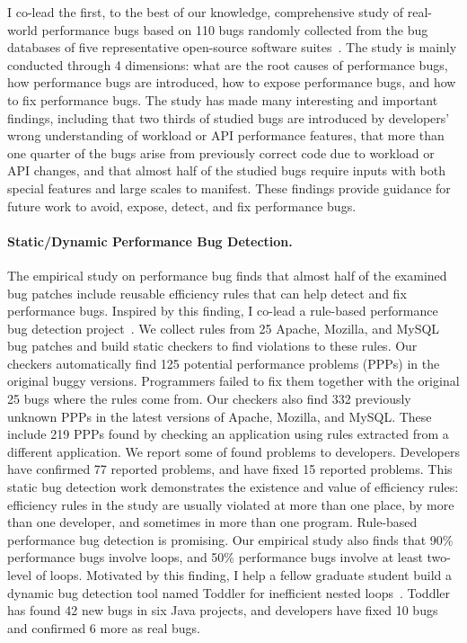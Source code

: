 \documentclass[10pt]{article}
\begin{document}
I co-lead the first, to the best of our knowledge, 
comprehensive study of real-world performance bugs based on 110 bugs randomly collected from the bug databases of five representative open-source software suites~\cite{jin12perfbug}. 
The study is mainly conducted through 4 dimensions: 
what are the root causes of performance bugs, 
how performance bugs are introduced, 
how to expose performance bugs, and how to fix performance bugs. 
The study has made many interesting and important findings, 
including that two thirds of studied bugs are introduced by developers' 
wrong understanding of workload or API performance features, 
that more than one quarter of the bugs arise from previously correct code due to workload or API changes, 
and that almost half of the studied bugs require inputs with both special features and large scales to manifest. 
These findings provide guidance for future work to avoid, expose, detect, and fix performance bugs.


\paragraph{Static/Dynamic Performance Bug Detection.}
The empirical study on performance bug finds that almost half of the examined bug patches 
include reusable efficiency rules that can help detect and fix performance bugs. 
Inspired by this finding, I co-lead a rule-based performance bug detection project~\cite{jin12perfbug}. 
We collect rules from 25 Apache, Mozilla, and MySQL bug patches 
and build static checkers to find violations to these rules. 
Our checkers automatically find 125 potential performance problems (PPPs) 
in the original buggy versions. 
Programmers failed to fix them together with the original 25 bugs where the rules come from. 
Our checkers also find 332 previously unknown PPPs in the latest versions of Apache, Mozilla, and MySQL. 
These include 219 PPPs found by checking an application using rules extracted from a different application.
We report some of found problems to developers. Developers have confirmed 77 reported problems, and have fixed 15 reported problems.  
This static bug detection work demonstrates the existence and value of efficiency rules: 
efficiency rules in the study are usually violated at more than one place, 
by more than one developer, and sometimes in more than one program. Rule-based performance bug detection is promising. 
Our empirical study also finds that 90\% performance bugs involve loops, 
and 50\% performance bugs involve at least two-level of loops. 
Motivated by this finding, I help a fellow graduate student build a dynamic bug detection tool named Toddler for inefficient nested loops~\cite{Nistor13ICSE}. 
Toddler has found 42 new bugs in six Java projects, and developers have fixed 10 bugs and confirmed 6 more as real bugs. 
\end{document}
